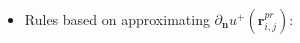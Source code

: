 \documentclass{elsarticle}
\begin{document}
\begin{itemize}
	\item Rules based on approximating $\partial_\mathbf{n}u^+(\mathbf{r}^{pr}_{i,j})$:
\end{itemize}
\end{document}
